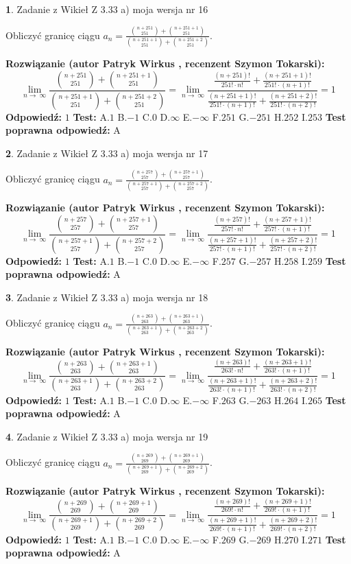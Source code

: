 \documentclass[12pt, a4paper]{article}
\theoremstyle{definition} %
\newtheorem{zad}{}
\newcommand{\zadStart}[1]{\begin{zad}#1\newline}
\newcommand{\zadStop}{\end{zad}}
\newcommand{\rozwStart}[2]{\noindent \textbf{Rozwiązanie (autor #1 , recenzent #2): }\newline}
\newcommand{\rozwStop}{\newline}
\newcommand{\odpStart}{\noindent \textbf{Odpowiedź:}\newline}
\newcommand{\odpStop}{\newline}
\newcommand{\testStart}{\noindent \textbf{Test:}\newline}
\newcommand{\testStop}{\newline}
\newcommand{\kluczStart}{\noindent \textbf{Test poprawna odpowiedź:}\newline}
\newcommand{\kluczStop}{\newline}
\begin{document}
\zadStart{Zadanie z Wikieł Z 3.33 a) moja wersja nr 16}

Obliczyć granicę ciągu $a_{n}=\frac{{n+251\choose251}+{n+251+1\choose251}}{{n+251+1\choose251}+{n+251+2\choose251}}$.
\zadStop
\rozwStart{Patryk Wirkus}{Szymon Tokarski}
$$\lim\limits_{n\to\ \infty}\frac{{n+251\choose251}+{n+251+1\choose251}}{{n+251+1\choose251}+{n+251+2\choose251}} = \lim\limits_{n\to\ \infty}\frac{\frac{(n+251)!}{251! \cdot n!}+\frac{(n+251+1)!}{251! \cdot (n+1)!}}{\frac{(n+251+1)!}{251! \cdot (n+1)!}+\frac{(n+251+2)!}{251! \cdot (n+2)!}} = 1$$
\rozwStop
\odpStart
$1$
\odpStop
\testStart
A.$1$ B.$-1$ C.$0$ D.$\infty$ E.$-\infty$
F.$251$ G.$-251$
H.$252$
I.$253$
\testStop
\kluczStart
A
\kluczStop



\zadStart{Zadanie z Wikieł Z 3.33 a) moja wersja nr 17}

Obliczyć granicę ciągu $a_{n}=\frac{{n+257\choose257}+{n+257+1\choose257}}{{n+257+1\choose257}+{n+257+2\choose257}}$.
\zadStop
\rozwStart{Patryk Wirkus}{Szymon Tokarski}
$$\lim\limits_{n\to\ \infty}\frac{{n+257\choose257}+{n+257+1\choose257}}{{n+257+1\choose257}+{n+257+2\choose257}} = \lim\limits_{n\to\ \infty}\frac{\frac{(n+257)!}{257! \cdot n!}+\frac{(n+257+1)!}{257! \cdot (n+1)!}}{\frac{(n+257+1)!}{257! \cdot (n+1)!}+\frac{(n+257+2)!}{257! \cdot (n+2)!}} = 1$$
\rozwStop
\odpStart
$1$
\odpStop
\testStart
A.$1$ B.$-1$ C.$0$ D.$\infty$ E.$-\infty$
F.$257$ G.$-257$
H.$258$
I.$259$
\testStop
\kluczStart
A
\kluczStop



\zadStart{Zadanie z Wikieł Z 3.33 a) moja wersja nr 18}

Obliczyć granicę ciągu $a_{n}=\frac{{n+263\choose263}+{n+263+1\choose263}}{{n+263+1\choose263}+{n+263+2\choose263}}$.
\zadStop
\rozwStart{Patryk Wirkus}{Szymon Tokarski}
$$\lim\limits_{n\to\ \infty}\frac{{n+263\choose263}+{n+263+1\choose263}}{{n+263+1\choose263}+{n+263+2\choose263}} = \lim\limits_{n\to\ \infty}\frac{\frac{(n+263)!}{263! \cdot n!}+\frac{(n+263+1)!}{263! \cdot (n+1)!}}{\frac{(n+263+1)!}{263! \cdot (n+1)!}+\frac{(n+263+2)!}{263! \cdot (n+2)!}} = 1$$
\rozwStop
\odpStart
$1$
\odpStop
\testStart
A.$1$ B.$-1$ C.$0$ D.$\infty$ E.$-\infty$
F.$263$ G.$-263$
H.$264$
I.$265$
\testStop
\kluczStart
A
\kluczStop



\zadStart{Zadanie z Wikieł Z 3.33 a) moja wersja nr 19}

Obliczyć granicę ciągu $a_{n}=\frac{{n+269\choose269}+{n+269+1\choose269}}{{n+269+1\choose269}+{n+269+2\choose269}}$.
\zadStop
\rozwStart{Patryk Wirkus}{Szymon Tokarski}
$$\lim\limits_{n\to\ \infty}\frac{{n+269\choose269}+{n+269+1\choose269}}{{n+269+1\choose269}+{n+269+2\choose269}} = \lim\limits_{n\to\ \infty}\frac{\frac{(n+269)!}{269! \cdot n!}+\frac{(n+269+1)!}{269! \cdot (n+1)!}}{\frac{(n+269+1)!}{269! \cdot (n+1)!}+\frac{(n+269+2)!}{269! \cdot (n+2)!}} = 1$$
\rozwStop
\odpStart
$1$
\odpStop
\testStart
A.$1$ B.$-1$ C.$0$ D.$\infty$ E.$-\infty$
F.$269$ G.$-269$
H.$270$
I.$271$
\testStop
\kluczStart
A
\kluczStop
\end{document}
